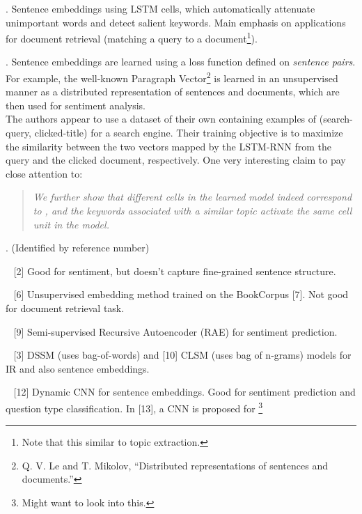\documentclass[11pt]{article}
\begin{document}
\p {}. Sentence embeddings using LSTM cells, which automatically attenuate unimportant words and detect salient keywords. Main emphasis on applications for document retrieval (matching a query to a document\footnote{Note that this similar to topic extraction.}).

\myspace
\p {}. Sentence embeddings are learned using a loss function defined on \textit{sentence pairs}. For example, the well-known Paragraph Vector\footnote{Q. V. Le and T. Mikolov, “Distributed representations of sentences and documents.”} is learned in an unsupervised manner as a distributed representation of sentences and documents, which are then used for sentiment analysis. \\

\p The authors appear to use a dataset of their own containing examples of (search-query, clicked-title) for a search engine. Their training objective is to maximize the similarity between the two vectors mapped by the LSTM-RNN from the query and the clicked document, respectively. One very interesting claim to pay close attention to:
\vspace{-1em}
\begin{quote}
	{\small \textit{We further show that different cells in the learned model indeed correspond to , and the keywords associated with a similar topic activate the same cell unit in the model.} }
\end{quote}

\myspace
\p {}. (Identified by reference number)
\begin{compactitem}
	\item ~ [2] Good for sentiment, but doesn't capture fine-grained sentence structure.
	
	\item ~ [6] Unsupervised embedding method trained on the BookCorpus [7]. Not good for document retrieval task.
	
	\item ~ [9] Semi-supervised Recursive Autoencoder (RAE) for sentiment prediction.
	
	\item ~ [3] DSSM (uses bag-of-words) and [10] CLSM (uses bag of n-grams) models for IR and also sentence embeddings.
	
	\item ~ [12] Dynamic CNN for sentence embeddings. Good for sentiment prediction and question type classification. In [13], a CNN is proposed for \footnote{Might want to look into this.}
\end{compactitem}
\end{document}
